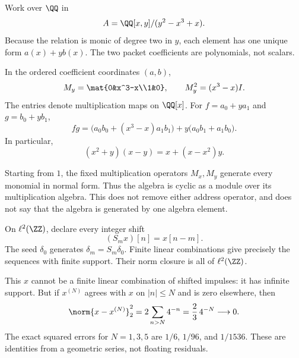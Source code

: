 Work over $\QQ$ in
\[
A=\QQ[x,y]/(y^2-x^3+x).
\]
Because the relation is monic of degree two in $y$, each element has one unique form $a(x)+yb(x)$. The two packet coefficients are polynomials, not scalars.


In the ordered coefficient coordinates $(a,b)$,
\[
M_y=\mat{0&x^3-x\\1&0},\qquad M_y^2=(x^3-x)I.
\]
The entries denote multiplication maps on $\QQ[x]$. For $f=a_0+ya_1$ and $g=b_0+yb_1$,
\[
fg=\bigl(a_0b_0+(x^3-x)a_1b_1\bigr)
+y\bigl(a_0b_1+a_1b_0\bigr).
\]
In particular,
\[
(x^2+y)(x-y)=x+(x-x^2)y.
\]

Starting from $1$, the fixed multiplication operators $M_x,M_y$ generate every monomial in normal form. Thus the algebra is cyclic as a module over its multiplication algebra. This does not remove either address operator, and does not say that the algebra is generated by one algebra element.


On $\ell^2(\ZZ)$, declare every integer shift
\[
(S_mx)[n]=x[n-m].
\]
The seed $\delta_0$ generates $\delta_m=S_m\delta_0$. Finite linear combinations give precisely the sequences with finite support. Their norm closure is all of $\ell^2(\ZZ)$.


This $x$ cannot be a finite linear combination of shifted impulses: it has infinite support. But if $x^{(N)}$ agrees with $x$ on $|n|\le N$ and is zero elsewhere, then
\[
\norm{x-x^{(N)}}_2^2
=2\sum_{n>N}4^{-n}
=\frac{2}{3}\,4^{-N}\longrightarrow0.
\]
The exact squared errors for $N=1,3,5$ are $1/6$, $1/96$, and $1/1536$. These are identities from a geometric series, not floating residuals.

